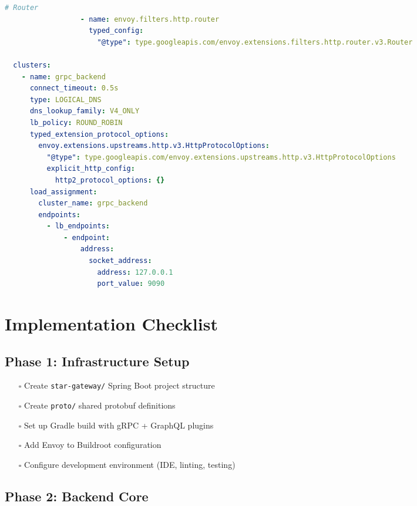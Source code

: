 \documentclass[11pt,letterpaper]{article}
\begin{document}
\begin{lstlisting}[language=yaml, caption=/opt/envoy/envoy.yaml]
                  # Router
                  - name: envoy.filters.http.router
                    typed_config:
                      "@type": type.googleapis.com/envoy.extensions.filters.http.router.v3.Router

  clusters:
    - name: grpc_backend
      connect_timeout: 0.5s
      type: LOGICAL_DNS
      dns_lookup_family: V4_ONLY
      lb_policy: ROUND_ROBIN
      typed_extension_protocol_options:
        envoy.extensions.upstreams.http.v3.HttpProtocolOptions:
          "@type": type.googleapis.com/envoy.extensions.upstreams.http.v3.HttpProtocolOptions
          explicit_http_config:
            http2_protocol_options: {}
      load_assignment:
        cluster_name: grpc_backend
        endpoints:
          - lb_endpoints:
              - endpoint:
                  address:
                    socket_address:
                      address: 127.0.0.1
                      port_value: 9090
\end{lstlisting}

\section{Implementation Checklist}

\subsection{Phase 1: Infrastructure Setup}

\begin{enumerate}
    \item[$\square$] Create \texttt{star-gateway/} Spring Boot project structure
    \item[$\square$] Create \texttt{proto/} shared protobuf definitions
    \item[$\square$] Set up Gradle build with gRPC + GraphQL plugins
    \item[$\square$] Add Envoy to Buildroot configuration
    \item[$\square$] Configure development environment (IDE, linting, testing)
\end{enumerate}

\subsection{Phase 2: Backend Core}
\end{document}
